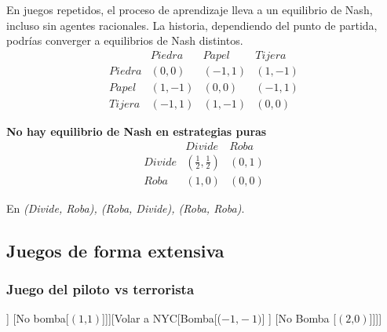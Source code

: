 \documentclass[letterpaper,12pt,twocolumn]{report}
\begin{document}
En juegos repetidos, el proceso de aprendizaje lleva a un equilibrio de Nash, incluso sin agentes racionales. La historia, dependiendo del punto de partida, podrías converger a equilibrios de Nash distintos.
$$
\begin{matrix}
  &	Piedra & Papel & Tijera \\
  Piedra & (0,0) & (-1,1) & (1,-1) \\
  Papel & (1,-1) & (0,0) & (-1,1) \\
  Tijera & (-1,1) & (1,-1) & (0,0)
\end{matrix}
$$

\textbf{No hay equilibrio de Nash en estrategias puras}
$$
\begin{matrix}
	&	Divide & Roba \\
	Divide & (\frac{1}{2},\frac{1}{2}) & (0,1) \\
	Roba & (1,0) & (0,0)
\end{matrix}
$$

En \textit{(Divide, Roba), (Roba, Divide), (Roba, Roba)}.

\subsection*{Juegos de forma extensiva}
\subsubsection*{Juego del piloto vs terrorista}


\begin{forest}
	[El piloto mueve [Volar a cuba [Bomba [$(?\text{,}-1)$] ] [No bomba[$(1\text{,}1)$]]][Volar a NYC[Bomba[($-1\text{,}-1)$] ] [No Bomba [$(2\text{,}0)$]]]]
\end{forest}
\end{document}
